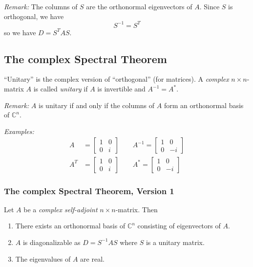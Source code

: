 \documentclass[11pt]{article}
\begin{document}
    \emph{Remark:} The columns of $S$ are the orthonormal eigenvectors of $A$. Since $S$ is orthogonal, we have \[S^{-1} = S^T\] so we have \(D = S^T AS\).

    \subsection{The complex Spectral Theorem}

    ``Unitary'' is the complex version of ``orthogonal'' (for matrices). A \emph{complex} \(n \times n\)-matrix $A$ is called \emph{unitary} if $A$ is invertible and \(A^{-1} = A^*\). 

    \vspace{1em}

    \emph{Remark:} $A$ is unitary if and only if the columns of $A$ form an orthonormal basis of \(\mathbb{C}^n\). 

    \vspace{1em}

    \emph{Examples:}
    \begin{align*}
        A &= \begin{bmatrix}
            1 & 0 \\ 0 & i
        \end{bmatrix} \qquad A^{-1} = \begin{bmatrix}
            1  & 0 \\ 0 & -i
        \end{bmatrix} \\
        A^T &= \begin{bmatrix}
            1 & 0 \\ 0 & i
        \end{bmatrix} \qquad A^* = \begin{bmatrix}
            1 & 0 \\ 0 & -i
        \end{bmatrix}
    \end{align*}

    \subsubsection{The complex Spectral Theorem, Version 1}

    Let $A$ be a \emph{complex self-adjoint} \(n \times n\)-matrix. Then
    \begin{enumerate}
        \item There exists an orthonormal basis of \(\mathbb{C}^n\) consisting of eigenvectors of $A$.
        \item $A$ is diagonalizable as \(D = S^{-1} AS\) where $S$ is a unitary matrix.
        \item The eigenvalues of $A$ are real.
    \end{enumerate}
\end{document}
